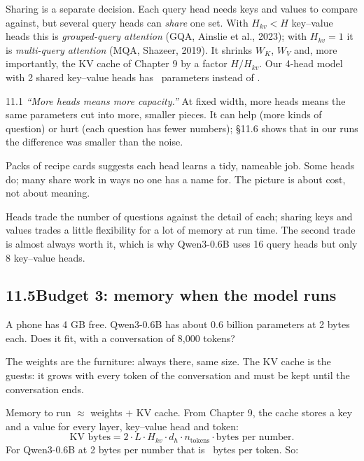 Sharing is a separate decision. Each query head needs keys and values to compare against, but several
query heads can \emph{share} one set. With $H_{kv}<H$ key--value heads this is \emph{grouped-query
attention} (GQA, Ainslie et al., 2023); with $H_{kv}=1$ it is \emph{multi-query attention} (MQA,
Shazeer, 2019). It shrinks $W_K$, $W_V$ and, more importantly, the KV cache of Chapter 9 by a factor
$H/H_{kv}$. Our 4-head model with 2 shared key--value heads has \nElevenPGqa\ parameters instead of
\nElevenPFourHeads.

\begin{wrongidea}{11.1}
\emph{``More heads means more capacity.''} At fixed width, more heads means the same parameters cut into
more, smaller pieces. It can help (more kinds of question) or hurt (each question has fewer numbers);
\S11.6 shows that in our runs the difference was smaller than the noise.
\end{wrongidea}

\begin{breaks}
Packs of recipe cards suggests each head learns a tidy, nameable job. Some heads do; many share work in
ways no one has a name for. The picture is about cost, not about meaning.
\end{breaks}

\Why Heads trade the number of questions against the detail of each; sharing keys and values trades a
little flexibility for a lot of memory at run time. The second trade is almost always worth it, which is
why Qwen3-0.6B uses 16 query heads but only 8 key--value heads.


\subsection*{11.5\quad Budget 3: memory when the model runs}

\Predict A phone has 4 GB free. Qwen3-0.6B has about 0.6 billion parameters at 2 bytes each. Does it fit,
with a conversation of 8{,}000 tokens?

\Picture The weights are the furniture: always there, same size. The KV cache is the guests: it grows
with every token of the conversation and must be kept until the conversation ends.

\Exactly Memory to run $\approx$ weights $+$ KV cache. From Chapter 9, the cache stores a key and a value
for every layer, key--value head and token:
\[
\text{KV bytes} = 2 \cdot L \cdot H_{kv} \cdot d_h \cdot n_{\text{tokens}} \cdot \text{bytes per number}.
\]
For Qwen3-0.6B at 2 bytes per number that is \nElevenPhoneKvPerTok\ bytes per token. So:

